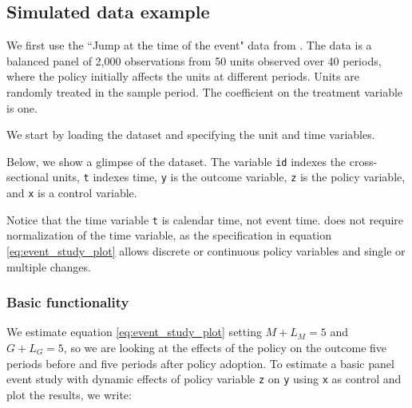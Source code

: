 \documentclass[12pt]{article}
\begin{document}
\subsection{Simulated data example} \label{sec:sim}

We first use the ``Jump at the time of the event" data from \citet{freyaldenhoven2021data}.
The data is a balanced panel of 2,000 observations from 50 units observed over 40 periods, where the policy initially affects the units at different periods.
Units are randomly treated in the sample period.
The coefficient on the treatment variable is one.

We start by loading the dataset and specifying the unit and time variables.
\begin{stlog}
	\nullskip
\end{stlog}

Below, we show a glimpse of the dataset.
The variable \texttt{id} indexes the cross-sectional units, \texttt{t} indexes time, \texttt{y} is the outcome variable, \texttt{z} is the policy variable, and \texttt{x} is a control variable.

\begin{stlog}
	\nullskip
\end{stlog}

Notice that the time variable \texttt{t} is calendar time, not event time.
\xtevent does not require normalization of the time variable, as the specification in equation \eqref{eq:event_study_plot} allows discrete or continuous policy variables and single or multiple changes.

\subsubsection*{Basic functionality}
\label{sec:examples_basic}

We estimate equation \eqref{eq:event_study_plot} setting $M + L_M = 5$ and $G + L_G = 5$, so we are looking at the effects of the policy on the outcome five periods before and five periods after policy adoption.
To estimate a basic panel event study with dynamic effects of policy variable \texttt{z} on \texttt{y} using \texttt{x} as control and plot the results, we write:

\begin{stlog}
	\nullskip
\end{stlog}
\end{document}
